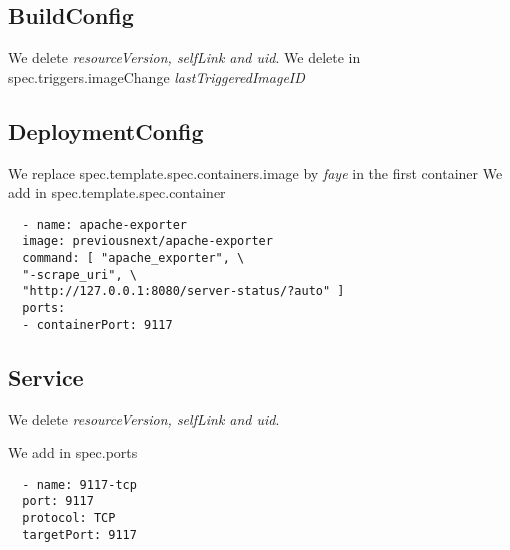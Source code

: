 \subsection{BuildConfig}
We delete \emph{resourceVersion, selfLink and uid}. We delete in spec.triggers.imageChange \emph{lastTriggeredImageID}

\subsection{DeploymentConfig}
We replace spec.template.spec.containers.image by \emph{faye} in the first container
We add in spec.template.spec.container

\begin{verbatim}
  - name: apache-exporter
  image: previousnext/apache-exporter
  command: [ "apache_exporter", \
  "-scrape_uri", \
  "http://127.0.0.1:8080/server-status/?auto" ]
  ports:
  - containerPort: 9117
\end{verbatim}

\subsection{Service}
We delete \emph{resourceVersion, selfLink and uid}.

We add in spec.ports

\begin{verbatim}
  - name: 9117-tcp
  port: 9117
  protocol: TCP
  targetPort: 9117
\end{verbatim}